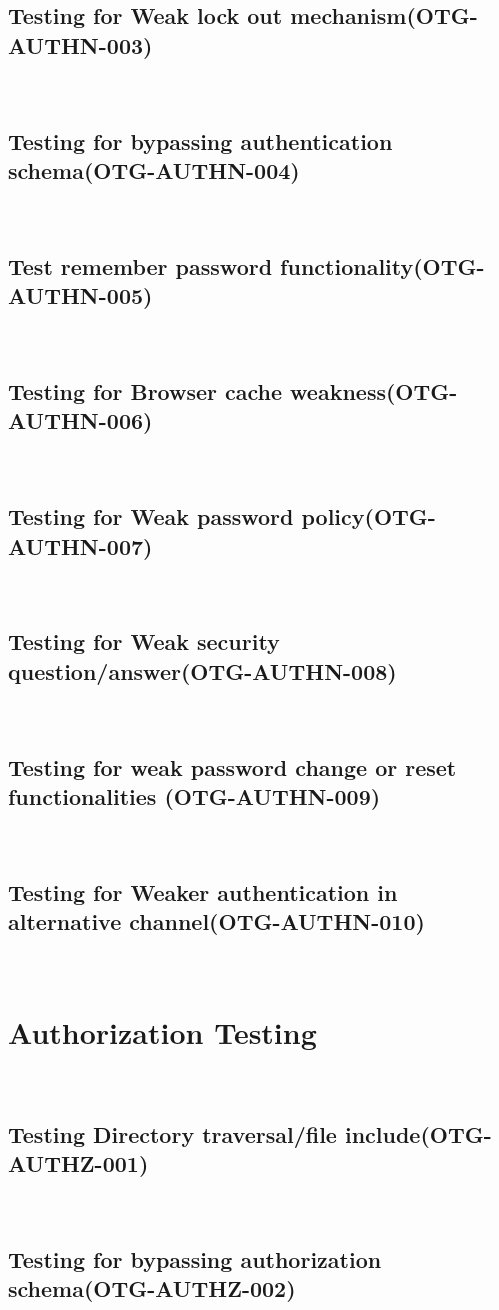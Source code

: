 \documentclass[headsepline,footsepline,footinclude=false,oneside,fontsize=11pt,paper=a4,listof=totoc,bibliography=totoc]{scrbook} %
\begin{document}
\subsection{Testing for Weak lock out mechanism(OTG-AUTHN-003)}\
\pagebreak
\subsection{Testing for bypassing authentication schema(OTG-AUTHN-004)}\
\pagebreak
\subsection{Test remember password functionality(OTG-AUTHN-005)}\
\pagebreak
\subsection{Testing for Browser cache weakness(OTG-AUTHN-006)}\
\pagebreak
\subsection{Testing for Weak password policy(OTG-AUTHN-007)}\
\pagebreak
\subsection{Testing for Weak security question/answer(OTG-AUTHN-008)}\
\pagebreak
\subsection{Testing for weak password change or reset functionalities (OTG-AUTHN-009)}\
\pagebreak
\subsection{Testing for Weaker authentication in alternative channel(OTG-AUTHN-010)}\

\pagebreak
\section{Authorization Testing}\
\subsection{Testing Directory traversal/file include(OTG-AUTHZ-001)}\
\pagebreak
\subsection{Testing for bypassing authorization schema(OTG-AUTHZ-002)}\
\pagebreak
\end{document}
